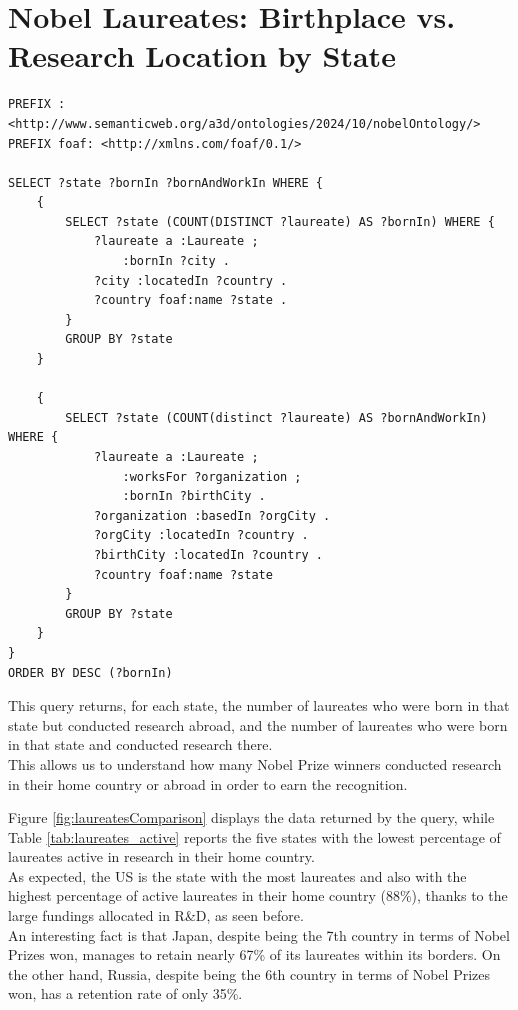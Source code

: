 \documentclass{article}
\begin{document}
\newpage

\section{Nobel Laureates: Birthplace vs. Research Location by State}
\begin{lstlisting}
PREFIX : <http://www.semanticweb.org/a3d/ontologies/2024/10/nobelOntology/>
PREFIX foaf: <http://xmlns.com/foaf/0.1/>

SELECT ?state ?bornIn ?bornAndWorkIn WHERE {
    {
        SELECT ?state (COUNT(DISTINCT ?laureate) AS ?bornIn) WHERE {
            ?laureate a :Laureate ;
                :bornIn ?city .
            ?city :locatedIn ?country .
            ?country foaf:name ?state .
        }
        GROUP BY ?state
    }

    {
        SELECT ?state (COUNT(distinct ?laureate) AS ?bornAndWorkIn) WHERE {
            ?laureate a :Laureate ;
                :worksFor ?organization ;
                :bornIn ?birthCity .
            ?organization :basedIn ?orgCity .
            ?orgCity :locatedIn ?country .
            ?birthCity :locatedIn ?country .
            ?country foaf:name ?state
        }
        GROUP BY ?state
    }
}
ORDER BY DESC (?bornIn)
\end{lstlisting}

\noindent This query returns, for each state, the number of laureates who were born in that state but conducted research abroad, and the number of
laureates who were born in that state and conducted research there.\\
This allows us to understand how many Nobel Prize winners conducted research in their home country or abroad in order to earn the recognition.

Figure \ref{fig:laureatesComparison} displays the data returned by the query, while Table \ref{tab:laureates_active} reports the five states with the lowest percentage
of laureates active in research in their home country.\\
As expected, the US is the state with the most laureates and also with the highest percentage
of active laureates in their home country (88\%), thanks to the large fundings allocated in R\&D, as seen before.\\
An interesting fact is that Japan, despite being the 7th country in terms of Nobel Prizes won, manages to retain nearly 67\% of its laureates
within its borders. On the other hand, Russia, despite being the 6th country in terms of Nobel Prizes won, has a retention rate of only 35\%.
\end{document}
